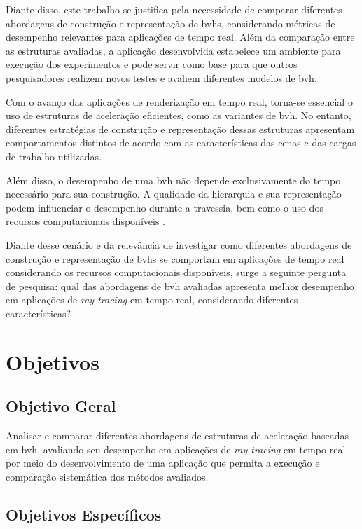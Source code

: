 Diante disso, este trabalho se justifica pela necessidade de comparar diferentes abordagens de construção e representação de \glspl{bvh}, considerando métricas de desempenho relevantes para aplicações de tempo real. Além da comparação entre as estruturas avaliadas, a aplicação desenvolvida estabelece um ambiente para execução dos experimentos e pode servir como base para que outros pesquisadores realizem novos testes e avaliem diferentes modelos de \gls{bvh}.

Com o avanço das aplicações de renderização em tempo real, torna-se essencial o uso de estruturas de aceleração eficientes, como as variantes de \gls{bvh}. No entanto, diferentes estratégias de construção e representação dessas estruturas apresentam comportamentos distintos de acordo com as características das cenas e das cargas de trabalho utilizadas.

Além disso, o desempenho de uma \gls{bvh} não depende exclusivamente do tempo necessário para sua construção. A qualidade da hierarquia e sua representação podem influenciar o desempenho durante a travessia, bem como o uso dos recursos computacionais disponíveis \cite{meister2022performance}.

Diante desse cenário e da relevância de investigar como diferentes abordagens de construção e representação de \glspl{bvh} se comportam em aplicações de tempo real considerando os recursos computacionais disponíveis, surge a seguinte pergunta de pesquisa: qual das abordagens de \gls{bvh} avaliadas apresenta melhor desempenho em aplicações de \textit{ray tracing} em tempo real, considerando diferentes características?

\section{Objetivos}

\subsection{Objetivo Geral}

Analisar e comparar diferentes abordagens de estruturas de aceleração baseadas em \gls{bvh}, avaliando seu desempenho em aplicações de \textit{ray tracing} em tempo real, por meio do desenvolvimento de uma aplicação que permita a execução e comparação sistemática dos métodos avaliados.

\subsection{Objetivos Específicos}

